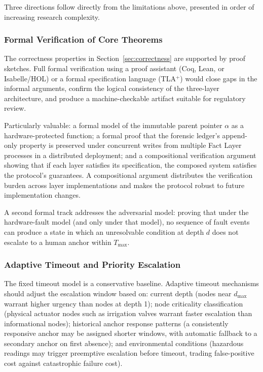 Three directions follow directly from the limitations above, presented in order of increasing research complexity.

\subsubsection{Formal Verification of Core Theorems}
\label{sec:future-formal-verification}

The correctness properties in Section~\ref{sec:correctness} are supported by proof sketches. Full formal verification using a proof assistant (Coq, Lean, or Isabelle/HOL) or a formal specification language (TLA$^+$) would close gaps in the informal arguments, confirm the logical consistency of the three-layer architecture, and produce a machine-checkable artifact suitable for regulatory review.

Particularly valuable: a formal model of the immutable parent pointer $\alpha$ as a hardware-protected function; a formal proof that the forensic ledger's append-only property is preserved under concurrent writes from multiple Fact Layer processes in a distributed deployment; and a compositional verification argument showing that if each layer satisfies its specification, the composed system satisfies the protocol's guarantees. A compositional argument distributes the verification burden across layer implementations and makes the protocol robust to future implementation changes.

A second formal track addresses the adversarial model: proving that under the hardware-fault model (and only under that model), no sequence of fault events can produce a state in which an unresolvable condition at depth $d$ does not escalate to a human anchor within $T_{\max}$.

\subsubsection{Adaptive Timeout and Priority Escalation}
\label{sec:future-adaptive-timeout}

The fixed timeout model is a conservative baseline. Adaptive timeout mechanisms should adjust the escalation window based on: current depth (nodes near $d_{\max}$ warrant higher urgency than nodes at depth 1); node criticality classification (physical actuator nodes such as irrigation valves warrant faster escalation than informational nodes); historical anchor response patterns (a consistently responsive anchor may be assigned shorter windows, with automatic fallback to a secondary anchor on first absence); and environmental conditions (hazardous readings may trigger preemptive escalation before timeout, trading false-positive cost against catastrophic failure cost).

